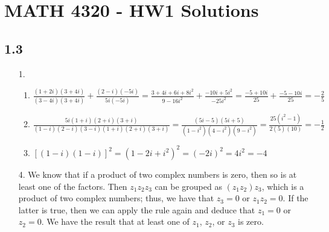 \documentclass[a4paper,12pt]{article}
\begin{document}
\section*{MATH 4320 - HW1 Solutions}

\subsection*{1.3}
\begin{enumerate}
    \item[1.]
        \begin{enumerate}
            \item
                $\frac{(1 + 2i)(3 + 4i)}{(3 - 4i)(3 + 4i)} + \frac{(2 - i)(-5i)}{5i(-5i)} = \frac{3 + 4i + 6i + 8i^2}{9 - 16i^2} + \frac{-10i + 5i^2}{-25i^2} = \frac{-5 + 10i}{25} + \frac{-5 - 10i}{25} = -\frac{2}{5}$

            \item
                $\frac{5i(1 + i)(2 + i)(3 + i)}{(1 - i)(2 - i)(3 - i)(1 + i)(2 + i)(3 + i)} = \frac{(5i - 5)(5i + 5)}{(1 - i^2)(4 - i^2)(9 - i^2)} = \frac{25(i^2 - 1)}{2(5)(10)} = -\frac{1}{2}$

            \item
                $[(1 - i)(1 - i)]^2 = (1 - 2i + i^2)^2 = (-2i)^2 = 4i^2 = -4$
        \end{enumerate}

    \item[4.]
        We know that if a product of two complex numbers is zero, then so is at least one of the factors. Then $z_1 z_2 z_3$ can be grouped as $(z_1 z_2) z_3$, which is a product of two complex numbers; thus, we have that $z_3 = 0$ or $z_1 z_2 = 0$. If the latter is true, then we can apply the rule again and deduce that $z_1 = 0$ or $z_2 = 0$. We have the result that at least one of $z_1$, $z_2$, or $z_3$ is zero.
\end{enumerate}
\end{document}
